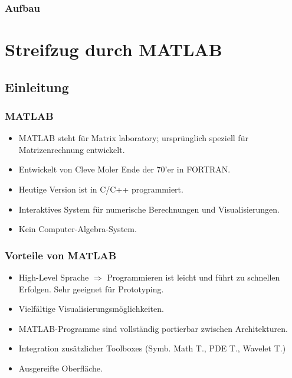 \subtitle{Einheit 1}

\begin{frame}[fragile]
  \titlepage
\note{}
\end{frame}

\begin{frame}[fragile]
  \frametitle{Aufbau}
  \tableofcontents
\note{}
\end{frame}


\section{Streifzug durch MATLAB}

\subsection{Einleitung}
\begin{frame}[fragile]\frametitle{MATLAB}

\begin{itemize}
\item MATLAB steht für \alert{Mat}rix \alert{lab}oratory; 
ursprünglich speziell für Matrizenrechnung entwickelt.
\item Entwickelt von Cleve Moler Ende der 70'er in FORTRAN.
\item Heutige Version ist in C/C++ programmiert.
\item Interaktives System für numerische Berechnungen und Visualisierungen.
\item Kein Computer-Algebra-System.
\end{itemize}
\end{frame}

\begin{frame}[fragile]\frametitle{Vorteile von MATLAB}

\begin{itemize}
\item High-Level Sprache $\Rightarrow$  Programmieren ist leicht und führt zu
  schnellen Erfolgen. Sehr geeignet für Prototyping.
\item Vielfältige Visualisierungsmöglichkeiten.
\item MATLAB-Programme sind vollständig portierbar zwischen Architekturen.
\item Integration zusätzlicher Toolboxes (Symb. Math T., PDE T., Wavelet T.)  
\item Ausgereifte Oberfläche.
\end{itemize}
\end{frame}


